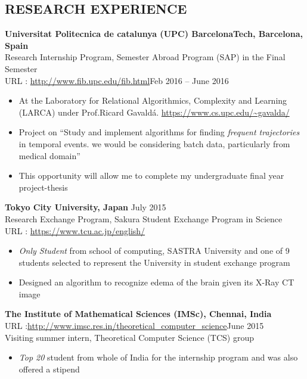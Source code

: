\documentclass[margin, 10pt]{res} %
\begin{document}
\begin{resume}
\section{RESEARCH EXPERIENCE}
{\textbf{Universitat Politecnica de catalunya (UPC) BarcelonaTech, Barcelona, Spain} \\
Research Internship Program, Semester Abroad Program (SAP) in the Final Semester\\URL : \url{http://www.fib.upc.edu/fib.html}\hfill Feb 2016 -- June 2016
\begin{itemize} \itemsep -2pt %
\item  At the Laboratory for Relational Algorithmics, Complexity and Learning (LARCA) under Prof.Ricard Gavald\'a. \url{https://www.cs.upc.edu/~gavalda/}
\item Project on ``Study and implement algorithms for finding \emph{frequent trajectories} in temporal events.  we would be considering batch data, particularly from medical domain''
\item This opportunity will allow me to complete my undergraduate final year project-thesis
\end{itemize}
{\textbf{Tokyo City University, Japan} \hfill July 2015 \\
Research Exchange Program, Sakura Student Exchange Program in Science \\URL : \url{https://www.tcu.ac.jp/english/}
\begin{itemize} \itemsep -2pt %
\item \emph{Only Student} from school of computing, SASTRA University and one of 9 students selected to represent the University in student exchange program
\item Designed an algorithm to recognize edema of the brain given its X-Ray CT image
\end{itemize}
{\textbf{The Institute of Mathematical Sciences (IMSc), Chennai, India}\\  URL :\url{http://www.imsc.res.in/theoretical_computer_science}\hfill June 2015 \\
Visiting summer intern, Theoretical Computer Science (TCS) group
\begin{itemize} \itemsep -2pt %
\item \emph{Top 20} student from whole of India for the internship program and was also offered a  stipend

\end{itemize}}}}
\end{resume}
\end{document}
